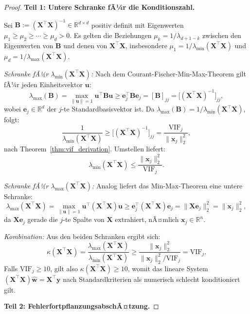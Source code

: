 ﻿\documentclass[12pt, a4paper]{article}
\theoremstyle{definition}
\theoremstyle{remark}
\newcommand{\R}{\mathbb{R}}
\newcommand{\vw}{\bm{w}}
\newcommand{\vx}{\bm{x}}
\newcommand{\vy}{\bm{y}}
\newcommand{\vX}{\bm{X}}
\newcommand{\T}{\top}
\begin{document}
\begin{proof}
	\textbf{Teil 1: Untere Schranke fÃ¼r die Konditionszahl.}
	
	Sei $\bm{B} := (\vX^\T\vX)^{-1} \in \R^{d\times d}$ positiv definit mit Eigenwerten
	$\mu_1 \geq \mu_2 \geq \cdots \geq \mu_d > 0$. Es gelten die Beziehungen
	$\mu_k = 1/\lambda_{d+1-k}$ zwischen den Eigenwerten von $\bm{B}$ und denen von
	$\vX^\T\vX$, insbesondere $\mu_1 = 1/\lambda_{\min}(\vX^\T\vX)$ und
	$\mu_d = 1/\lambda_{\max}(\vX^\T\vX)$.
	
	\emph{Schranke fÃ¼r $\lambda_{\min}(\vX^\T\vX)$:}
	Nach dem Courant-Fischer-Min-Max-Theorem gilt fÃ¼r jeden Einheitsvektor $\bm{u}$:
	\[
	\lambda_{\max}(\bm{B}) = \max_{\|\bm{u}\|=1} \bm{u}^\T\bm{B}\bm{u}
	\geq \bm{e}_j^\T\bm{B}\bm{e}_j = [\bm{B}]_{jj}
	= \bigl[(\vX^\T\vX)^{-1}\bigr]_{jj},
	\]
	wobei $\bm{e}_j \in \R^d$ der $j$-te Standardbasisvektor ist. Da
	$\lambda_{\max}(\bm{B}) = 1/\lambda_{\min}(\vX^\T\vX)$, folgt:
	\begin{equation}
		\frac{1}{\lambda_{\min}(\vX^\T\vX)} \geq \bigl[(\vX^\T\vX)^{-1}\bigr]_{jj}
		= \frac{\mathrm{VIF}_j}{\|\vx_j\|_2^2},
		\label{eq:lambda_min_bound}
	\end{equation}
	nach Theorem~\ref{thm:vif_derivation}. Umstellen liefert:
	\[
	\lambda_{\min}(\vX^\T\vX) \leq \frac{\|\vx_j\|_2^2}{\mathrm{VIF}_j}.
	\]
	
	\emph{Schranke fÃ¼r $\lambda_{\max}(\vX^\T\vX)$:}
	Analog liefert das Min-Max-Theorem eine untere Schranke:
	\[
	\lambda_{\max}(\vX^\T\vX) = \max_{\|\bm{u}\|=1} \bm{u}^\T(\vX^\T\vX)\bm{u}
	\geq \bm{e}_j^\T(\vX^\T\vX)\bm{e}_j = \|\vX\bm{e}_j\|_2^2 = \|\vx_j\|_2^2,
	\]
	da $\vX\bm{e}_j$ gerade die $j$-te Spalte von $\vX$ extrahiert, nÃ¤mlich $\vx_j \in \R^n$.
	
	\emph{Kombination:}
	Aus den beiden Schranken ergibt sich:
	\[
	\kappa(\vX^\T\vX)
	= \frac{\lambda_{\max}(\vX^\T\vX)}{\lambda_{\min}(\vX^\T\vX)}
	\geq \frac{\|\vx_j\|_2^2}{\|\vx_j\|_2^2 / \mathrm{VIF}_j}
	= \mathrm{VIF}_j.
	\]
	Falls $\mathrm{VIF}_j \geq 10$, gilt also $\kappa(\vX^\T\vX) \geq 10$, womit das
	lineare System $(\vX^\T\vX)\hat{\vw} = \vX^\T\vy$ nach Standardkriterien als numerisch
	schlecht konditioniert gilt.
	
	\textbf{Teil 2: FehlerfortpflanzungsabschÃ¤tzung.}
	

\end{proof}
\end{document}
